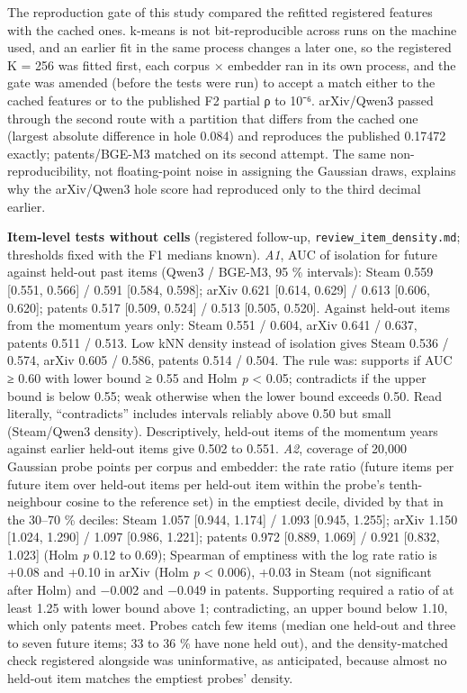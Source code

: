 \documentclass[
  10pt,
]{article}
\begin{document}
The reproduction gate of this study
compared the refitted registered
features with the cached ones. k-means
is not bit-reproducible across runs on
the machine used, and an earlier fit in
the same process changes a later one, so
the registered K = 256 was fitted first,
each corpus × embedder ran in its own
process, and the gate was amended
(before the tests were run) to accept a
match either to the cached features or
to the published F2 partial ρ to 10⁻⁶.
arXiv/Qwen3 passed through the second
route with a partition that differs from
the cached one (largest absolute
difference in hole 0.084) and reproduces
the published 0.17472 exactly;
patents/BGE-M3 matched on its second
attempt. The same non-reproducibility,
not floating-point noise in assigning
the Gaussian draws, explains why the
arXiv/Qwen3 hole score had reproduced
only to the third decimal earlier.

\textbf{Item-level tests without cells}
(registered follow-up,
\texttt{review\_\allowbreak{}item\_\allowbreak{}density.md};
thresholds fixed with the F1 medians
known). \emph{A1}, AUC of isolation for
future against held-out past items
(Qwen3 / BGE-M3, 95 \% intervals): Steam
0.559 {[}0.551, 0.566{]} / 0.591
{[}0.584, 0.598{]}; arXiv 0.621
{[}0.614, 0.629{]} / 0.613 {[}0.606,
0.620{]}; patents 0.517 {[}0.509,
0.524{]} / 0.513 {[}0.505, 0.520{]}.
Against held-out items from the momentum
years only: Steam 0.551 / 0.604, arXiv
0.641 / 0.637, patents 0.511 / 0.513.
Low kNN density instead of isolation
gives Steam 0.536 / 0.574, arXiv 0.605 /
0.586, patents 0.514 / 0.504. The rule
was: supports if AUC ≥ 0.60 with lower
bound ≥ 0.55 and Holm \emph{p}
\textless{} 0.05; contradicts if the
upper bound is below 0.55; weak
otherwise when the lower bound exceeds
0.50. Read literally, ``contradicts''
includes intervals reliably above 0.50
but small (Steam/Qwen3 density).
Descriptively, held-out items of the
momentum years against earlier held-out
items give 0.502 to 0.551. \emph{A2},
coverage of 20,000 Gaussian probe points
per corpus and embedder: the rate ratio
(future items per future item over
held-out items per held-out item within
the probe's tenth-neighbour cosine to
the reference set) in the emptiest
decile, divided by that in the 30--70 \%
deciles: Steam 1.057 {[}0.944, 1.174{]}
/ 1.093 {[}0.945, 1.255{]}; arXiv 1.150
{[}1.024, 1.290{]} / 1.097 {[}0.986,
1.221{]}; patents 0.972 {[}0.889,
1.069{]} / 0.921 {[}0.832, 1.023{]}
(Holm \emph{p} 0.12 to 0.69); Spearman
of emptiness with the log rate ratio is
+0.08 and +0.10 in arXiv (Holm \emph{p}
\textless{} 0.006), +0.03 in Steam (not
significant after Holm) and −0.002 and
−0.049 in patents. Supporting required a
ratio of at least 1.25 with lower bound
above 1; contradicting, an upper bound
below 1.10, which only patents meet.
Probes catch few items (median one
held-out and three to seven future
items; 33 to 36 \% have none held out),
and the density-matched check registered
alongside was uninformative, as
anticipated, because almost no held-out
item matches the emptiest probes'
density.
\end{document}
